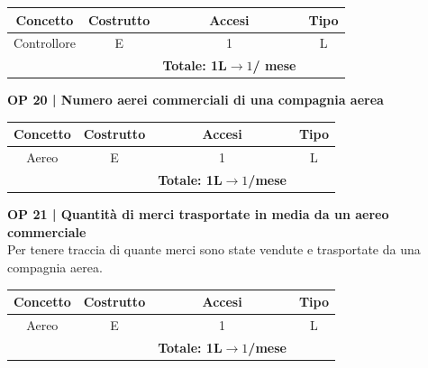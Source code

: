 \begin{tabular}{ c c c c}
	\hline
	\textbf{Concetto} & \textbf{Costrutto} & \textbf{Accesi} & \textbf{Tipo}\\
	\hline
	\textsf{\small Controllore} & \textsf{\small E} & \textsf{\small 1} &  \textsf{\small L}\\
	\hline
	\textsf{\small } & \textsf{\small } & \textbf{Totale: 1L$\rightarrow 1$/ mese} \textsf{\small } & \textsf{\small }\\
	\hline
\end{tabular}

\vspace{.6cm}


\textbf{\small OP 20 | Numero aerei commerciali di una compagnia aerea}\\

\begin{tabular}{ c c c c}
	\hline
	\textbf{Concetto} & \textbf{Costrutto} & \textbf{Accesi} & \textbf{Tipo}\\
	\hline
	\textsf{\small Aereo} & \textsf{\small E} & \textsf{\small 1} &  \textsf{\small L}\\
	\hline
	\textsf{\small } & \textsf{\small } & \textbf{Totale: 1L$\rightarrow 1$/mese } \textsf{\small } & \textsf{\small }\\
	\hline
\end{tabular}

\vspace{.6cm}


\textbf{\small OP 21 | Quantità di merci trasportate in media da un aereo commerciale}\\

\textsf{\small Per tenere traccia di quante merci sono state vendute e trasportate da una compagnia aerea.}\break

\begin{tabular}{ c c c c}
	\hline
	\textbf{Concetto} & \textbf{Costrutto} & \textbf{Accesi} & \textbf{Tipo}\\
	\hline
	\textsf{\small Aereo} & \textsf{\small E} & \textsf{\small 1} &  \textsf{\small L}\\
	\hline
	\textsf{\small } & \textsf{\small } & \textbf{Totale: 1L$\rightarrow 1$/mese } \textsf{\small } & \textsf{\small }\\
	\hline
\end{tabular}

